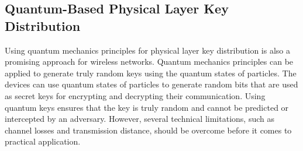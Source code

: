 \subsection{Quantum-Based Physical Layer Key Distribution}
Using quantum mechanics principles for physical layer key distribution is also a promising approach for wireless networks. Quantum mechanics principles can be applied to generate truly random keys using the quantum states of particles. The devices can use quantum states of particles to generate random bits that are used as secret keys for encrypting and decrypting their communication. Using quantum keys ensures that the key is truly random and cannot be predicted or intercepted by an adversary. However, several technical limitations, such as channel losses and transmission distance, should be overcome before it comes to practical application.

